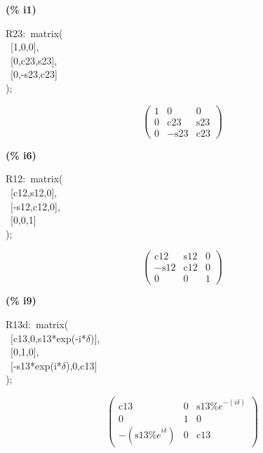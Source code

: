 \documentclass[fleqn]{article}
\begin{document}
\noindent
\begin{minipage}[t]{4.000000em}\color{red}\bfseries
(\% i1)	
\end{minipage}
\begin{minipage}[t]{\textwidth}\color{blue}
R23:\ matrix(\\
\ [1,0,0],\ \\
\ [0,c23,s23],\ \\
\ [0,-s23,c23]\\
);
\end{minipage}
\[\displaystyle \tag{R23} 
\begin{pmatrix}1 & 0 & 0\\
0 & \ensuremath{\mathrm{c23}} & \ensuremath{\mathrm{s23}}\\
0 & \mathop{-}\ensuremath{\mathrm{s23}} & \ensuremath{\mathrm{c23}}\end{pmatrix}\mbox{}
\]


\noindent
\begin{minipage}[t]{4.000000em}\color{red}\bfseries
(\% i6)	
\end{minipage}
\begin{minipage}[t]{\textwidth}\color{blue}
R12:\ matrix(\\
\ [c12,s12,0],\ \\
\ [-s12,c12,0],\ \\
\ [0,0,1]\\
);
\end{minipage}
\[\displaystyle \tag{R12} 
\begin{pmatrix}\ensuremath{\mathrm{c12}} & \ensuremath{\mathrm{s12}} & 0\\
\mathop{-}\ensuremath{\mathrm{s12}} & \ensuremath{\mathrm{c12}} & 0\\
0 & 0 & 1\end{pmatrix}\mbox{}
\]


\noindent
\begin{minipage}[t]{4.000000em}\color{red}\bfseries
(\% i9)	
\end{minipage}
\begin{minipage}[t]{\textwidth}\color{blue}
R13d:\ matrix(\\
\ [c13,0,s13*exp(-i*\ensuremath{\delta})],\ \\
\ [0,1,0],\ \\
\ [-s13*exp(i*\ensuremath{\delta}),0,c13]\\
);
\end{minipage}
\[\displaystyle \tag{R13d} 
\begin{pmatrix}\ensuremath{\mathrm{c13}} & 0 & \ensuremath{\mathrm{s13}} {{\% e}^{-\left( i \delta \right) }}\\
0 & 1 & 0\\
\mathop{-}\left( \ensuremath{\mathrm{s13}} {{\% e}^{i \delta }}\right)  & 0 & \ensuremath{\mathrm{c13}}\end{pmatrix}\mbox{}
\]
\end{document}
